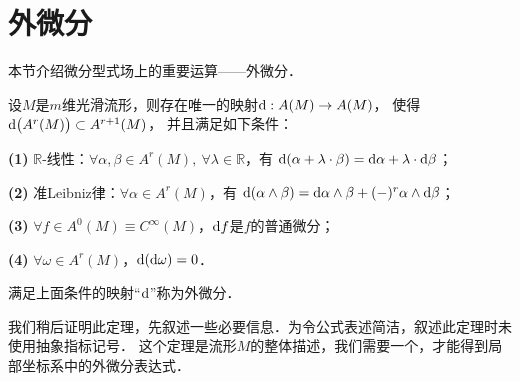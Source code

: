 \section{外微分}\label{chdf:sec_exterior-diff}
本节介绍微分型式场上的重要运算——外微分．
\begin{theorem}\label{chdf:thm_exterior-differential}
    设$M$是$m$维光滑流形，则存在唯一的映射${\rm d}: A(M)\to A(M)$，
    使得${\rm d}\bigl(A^r(M)\bigr)\subset A^{r+1}(M)$，
    并且满足如下条件：

    {\bfseries (1)} $\mathbb{R}$-线性：$\forall \alpha, \beta \in A^r(M), \ \forall \lambda \in \mathbb{R}$，有
      ${\rm d}(\alpha+ \lambda \cdot \beta) = {\rm d} \alpha+ \lambda \cdot {\rm d} \beta$；

    {\bfseries (2)} 准Leibniz律：$\forall \alpha \in A^{r}(M)$，有
      ${\rm d}(\alpha \wedge \beta) = {\rm d} \alpha \wedge \beta + (-)^{r} \alpha \wedge {\rm d} \beta$；

    {\bfseries (3)} $\forall f \in A^0(M) \equiv C^\infty(M)$，${\rm d} f$是$f$的普通微分；

    {\bfseries (4)} $\forall \omega \in A^r(M)$，${\rm d}({\rm d} \omega)=0$．

    满足上面条件的映射“${\rm d}$”称为{\heiti 外微分}．
\end{theorem}

我们稍后证明此定理，先叙述一些必要信息．为令公式表述简洁，叙述此定理时未使用抽象指标记号．
这个定理是流形$M$的整体描述，我们需要一个，才能得到局部坐标系中的外微分表达式．

